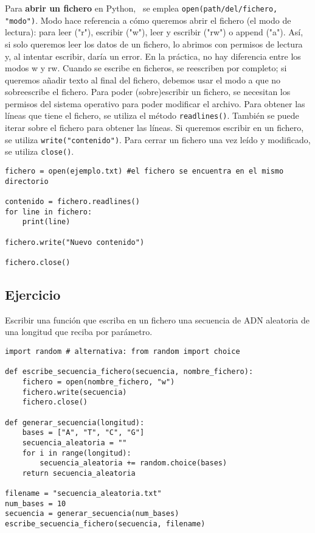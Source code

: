 Para \textbf{abrir un fichero} en Python,   \ se emplea \texttt{open(path/del/fichero, "modo")}. Modo hace referencia a cómo queremos abrir el fichero (el modo de lectura): para leer ("r"), escribir ("w"), leer y escribir ("rw") o append ("a"). Así, si solo queremos leer los datos de un fichero, lo abrimos con permisos de lectura y, al intentar escribir, daría un error. En la práctica, no hay diferencia entre los modos w y rw. Cuando se escribe en ficheros, se reescriben por completo; si queremos añadir texto al final del fichero, debemos usar el modo a que no sobreescribe el fichero. Para poder (sobre)escribir un fichero, se necesitan los permisos del sistema operativo para poder modificar el archivo. Para obtener las líneas que tiene el fichero, se utiliza el método \texttt{readlines()}. También se puede iterar sobre el fichero para obtener las líneas. Si queremos escribir en un fichero, se utiliza \texttt{write("contenido")}. Para cerrar un fichero una vez leído y modificado, se utiliza \texttt{close()}.
\begin{lstlisting}
fichero = open(ejemplo.txt) #el fichero se encuentra en el mismo directorio

contenido = fichero.readlines()
for line in fichero:
	print(line)
	
fichero.write("Nuevo contenido")
	
fichero.close()
\end{lstlisting}

\subsection{Ejercicio}
Escribir una función que escriba en un fichero una secuencia de ADN aleatoria de una longitud que reciba por parámetro.
\begin{lstlisting}
import random # alternativa: from random import choice

def escribe_secuencia_fichero(secuencia, nombre_fichero):
	fichero = open(nombre_fichero, "w")
	fichero.write(secuencia)
	fichero.close()

def generar_secuencia(longitud):
	bases = ["A", "T", "C", "G"] 
	secuencia_aleatoria = ""
	for i in range(longitud):
		secuencia_aleatoria += random.choice(bases)
	return secuencia_aleatoria
	
filename = "secuencia_aleatoria.txt"
num_bases = 10
secuencia = generar_secuencia(num_bases)
escribe_secuencia_fichero(secuencia, filename)
\end{lstlisting}

